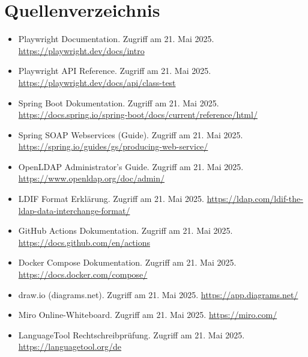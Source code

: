 
\chapter*{Quellenverzeichnis}
\vspace{-5em}
\begin{itemize}
    \item Playwright Documentation. Zugriff am 21. Mai 2025. \url{https://playwright.dev/docs/intro}
    \item Playwright API Reference. Zugriff am 21. Mai 2025. \url{https://playwright.dev/docs/api/class-test}
    \item Spring Boot Dokumentation. Zugriff am 21. Mai 2025. \url{https://docs.spring.io/spring-boot/docs/current/reference/html/}
    \item Spring SOAP Webservices (Guide). Zugriff am 21. Mai 2025. \url{https://spring.io/guides/gs/producing-web-service/}
    \item OpenLDAP Administrator's Guide. Zugriff am 21. Mai 2025. \url{https://www.openldap.org/doc/admin/}
    \item LDIF Format Erklärung. Zugriff am 21. Mai 2025. \url{https://ldap.com/ldif-the-ldap-data-interchange-format/}
    \item GitHub Actions Dokumentation. Zugriff am 21. Mai 2025. \url{https://docs.github.com/en/actions}
    \item Docker Compose Dokumentation. Zugriff am 21. Mai 2025. \url{https://docs.docker.com/compose/}
    \item draw.io (diagrams.net). Zugriff am 21. Mai 2025. \url{https://app.diagrams.net/}
    \item Miro Online-Whiteboard. Zugriff am 21. Mai 2025. \url{https://miro.com/}
    \item LanguageTool Rechtschreibprüfung. Zugriff am 21. Mai 2025. \url{https://languagetool.org/de}
  \end{itemize}